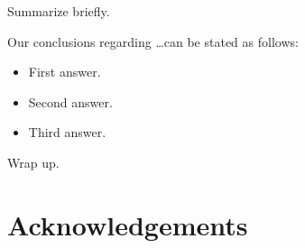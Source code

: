 \documentclass[useAMS,usenatbib]{mn2e}
\begin{document}
Summarize briefly.

Our conclusions regarding \ldots can be stated as follows:

\begin{itemize}

\item First answer.

\item Second answer. 

\item Third answer. 

\end{itemize}

Wrap up.



\section*{Acknowledgements}







\label{lastpage}
\bsp
\end{document}
